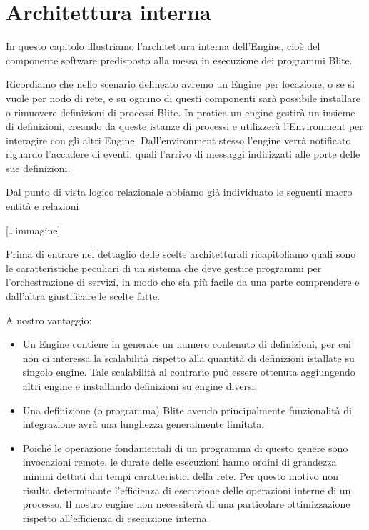\chapter{Architettura interna}

In questo capitolo illustriamo l'architettura interna dell'Engine, cioè del
componente software predisposto alla messa in esecuzione dei programmi Blite.

Ricordiamo che nello scenario delineato avremo un Engine per locazione, o se si
vuole per nodo di rete, e su ognuno di questi componenti sarà possibile
installare o rimuovere definizioni di processi Blite. In pratica un engine
gestir\`a un insieme di definizioni, creando da queste istanze di
processi e utilizzerà l'Environment per interagire con gli altri Engine. 
Dall'environment stesso l'engine verrà notificato riguardo l'accadere di
eventi, quali l'arrivo di messaggi indirizzati alle porte delle sue definizioni.

Dal punto di vista logico relazionale abbiamo già individuato le seguenti
macro entità e relazioni

[\ldots immagine]

Prima di entrare nel dettaglio delle scelte architetturali ricapitoliamo quali
sono le caratteristiche peculiari di un sistema che deve gestire programmi per
l'orchestrazione di servizi, in modo che sia pi\`u facile da una parte
comprendere e dall'altra giustificare le scelte fatte.

A nostro vantaggio:
\begin{itemize}
  \item Un Engine contiene in generale un numero contenuto di definizioni, per
  cui non ci interessa la scalabilità rispetto alla quantità di definizioni
  istallate su singolo engine. Tale scalabilità al contrario può essere
  ottenuta aggiungendo altri engine e installando definizioni su engine diversi.
  
  \item  Una definizione (o programma) Blite avendo principalmente funzionalità
  di integrazione avrà una lunghezza generalmente limitata. 
  
  \item Poiché le operazione fondamentali di un programma di questo genere
  sono invocazioni remote, le durate delle esecuzioni hanno ordini di grandezza
  minimi dettati dai tempi caratteristici della rete. Per questo motivo non
  risulta determinante l'efficienza di esecuzione delle operazioni interne di un
  processo. Il nostro engine non necessiterà di una particolare ottimizzazione 
  rispetto all'efficienza di esecuzione interna.
\end{itemize}

